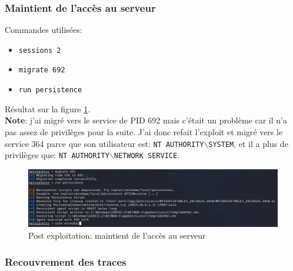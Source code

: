 \documentclass[a4paper]{article}
\begin{document}
\subsubsection{Maintient de l'accès au serveur}





Commandes utilisées:
\begin{itemize}
    \item \texttt{\footnotesize sessions 2}
    \item \texttt{\footnotesize migrate 692}
    \item \texttt{\footnotesize run persistence}
\end{itemize}
Résultat sur la figure \ref{fig:postMaintien}. \\
\textbf{Note}: j'ai migré vers le service de PID 692 mais c'était un problème car il n'a pas assez de privilèges pour la suite. J'ai donc refait l'exploit et migré vers le service 364 parce que son utilisateur est: \texttt{\footnotesize NT AUTHORITY$\backslash$SYSTEM}, et il a plus de privilèges que: \texttt{\footnotesize NT AUTHORITY$\backslash$NETWORK SERVICE}.

\begin{figure}[H]
    \centering
    \includegraphics[width=0.95\linewidth]{images/post-exploitation-maintient.PNG}
    \caption{Post exploitation: maintient de l'accès au serveur}
    \label{fig:postMaintien}
\end{figure}





\subsubsection{Recouvrement des traces}
\end{document}

